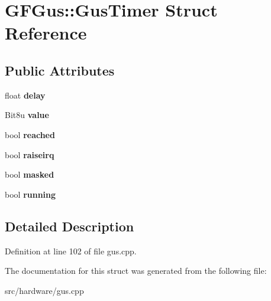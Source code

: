 \hypertarget{structGFGus_1_1GusTimer}{\section{G\-F\-Gus\-:\-:Gus\-Timer Struct Reference}
\label{structGFGus_1_1GusTimer}
}
\subsection*{Public Attributes}
\begin{DoxyCompactItemize}
\item 
\hypertarget{structGFGus_1_1GusTimer_aee952ea33d779a230a2652b5b7a0cac8}{float {\bfseries delay}}\label{structGFGus_1_1GusTimer_aee952ea33d779a230a2652b5b7a0cac8}

\item 
\hypertarget{structGFGus_1_1GusTimer_a31a1f93f014d45aef3fd61d0d5667481}{Bit8u {\bfseries value}}\label{structGFGus_1_1GusTimer_a31a1f93f014d45aef3fd61d0d5667481}

\item 
\hypertarget{structGFGus_1_1GusTimer_aef9e1ea5deb2d585b7f15eb62a89de85}{bool {\bfseries reached}}\label{structGFGus_1_1GusTimer_aef9e1ea5deb2d585b7f15eb62a89de85}

\item 
\hypertarget{structGFGus_1_1GusTimer_a4425a248a4b43b178b279f5a3e8a169c}{bool {\bfseries raiseirq}}\label{structGFGus_1_1GusTimer_a4425a248a4b43b178b279f5a3e8a169c}

\item 
\hypertarget{structGFGus_1_1GusTimer_ac033ff5008998588554e9319437e68a0}{bool {\bfseries masked}}\label{structGFGus_1_1GusTimer_ac033ff5008998588554e9319437e68a0}

\item 
\hypertarget{structGFGus_1_1GusTimer_a0cb384d64010c79f0a588b0ec81968e6}{bool {\bfseries running}}\label{structGFGus_1_1GusTimer_a0cb384d64010c79f0a588b0ec81968e6}

\end{DoxyCompactItemize}


\subsection{Detailed Description}


Definition at line 102 of file gus.\-cpp.



The documentation for this struct was generated from the following file\-:\begin{DoxyCompactItemize}
\item 
src/hardware/gus.\-cpp\end{DoxyCompactItemize}
